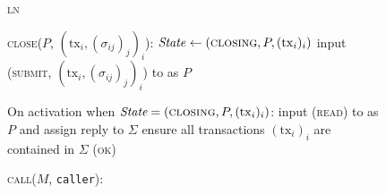 \begin{figure}[H]
\begin{systembox}{\textsc{ln}}
\begin{algorithmic}[1]
      \State \textsc{close}($P$, $(\mathrm{tx}_i, (\sigma_{ij})_j)_i$):
      \Indent
          \State $\mathit{State} \gets (\textsc{closing}, P, (\mathrm{tx}_i)_i)$
          \State input (\textsc{submit}, $(\mathrm{tx}_i, (\sigma_{ij})_j)_i$)
          to \ledger as $P$
      \EndIndent
      \Statex

      \State On activation when $\textit{State} = (\textsc{closing}, P,
      (\mathrm{tx}_i)_i)$:
      \Indent
        \State input (\textsc{read}) to \ledger as $P$ and assign reply to
        $\Sigma$
        \State ensure all transactions $(\mathrm{tx}_i)_i$ are contained in
        $\Sigma$
        \State \Return (\textsc{ok})
      \EndIndent
      \Statex

      \State \textsc{call}($M$, \texttt{caller}):
      \Indent
        \State \TODO{}
      \EndIndent
    \end{algorithmic}
  \end{systembox}
  \caption{}
  \label{code:ln}
\end{figure}
